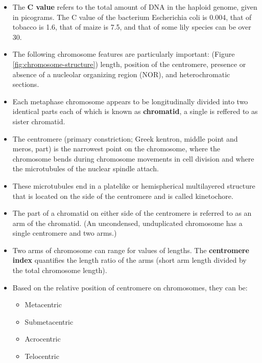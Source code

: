 \documentclass[11pt,ignorenonframetext,aspectratio=169]{beamer}
\providecommand{\tightlist}{%
  \setlength{\itemsep}{0pt}\setlength{\parskip}{0pt}}
\begin{document}
\begin{frame}{}
\protect\hypertarget{section-2}{}
\begin{itemize}
\tightlist
\item
  The \textbf{C value} refers to the total amount of DNA in the haploid
  genome, given in picograms. The C value of the bacterium Escherichia
  coli is 0.004, that of tobacco is 1.6, that of maize is 7.5, and that
  of some lily species can be over 30.
\item
  The following chromosome features are particularly important: (Figure
  \ref{fig:chromosome-structure}) length, position of the centromere,
  presence or absence of a nucleolar organizing region (NOR), and
  heterochromatic sections.
\item
  Each metaphase chromosome appears to be longitudinally divided into
  two identical parts each of which is known as \textbf{chromatid}, a
  single is reffered to as sister chromatid.
\item
  The centromere (primary constriction; Greek kentron, middle point and
  meros, part) is the narrowest point on the chromosome, where the
  chromosome bends during chromosome movements in cell division and
  where the microtubules of the nuclear spindle attach.
\end{itemize}
\end{frame}

\begin{frame}{}
\protect\hypertarget{section-3}{}
\begin{itemize}
\tightlist
\item
  These microtubules end in a platelike or hemispherical multilayered
  structure that is located on the side of the centromere and is called
  kinetochore.
\item
  The part of a chromatid on either side of the centromere is referred
  to as an arm of the chromatid. (An uncondensed, unduplicated
  chromosome has a single centromere and two arms.)
\item
  Two arms of chromosome can range for values of lengths. The
  \textbf{centromere index} quantifies the length ratio of the arms
  (short arm length divided by the total chromosome length).
\item
  Based on the relative position of centromere on chromosomes, they can
  be:

  \begin{itemize}
  \tightlist
  \item
    Metacentric
  \item
    Submetacentric
  \item
    Acrocentric
  \item
    Telocentric
  \end{itemize}
\end{itemize}
\end{frame}
\end{document}
